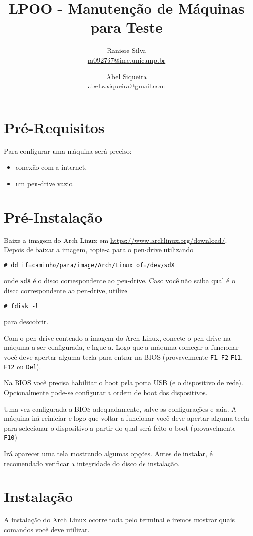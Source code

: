 \documentclass[A4paper]{article}
\title{LPOO - Manutenção de Máquinas para Teste}
\author{Raniere Silva \\ \url{ra092767@ime.unicamp.br} \and
        Abel Siqueira \\ \url{abel.s.siqueira@gmail.com}}
\begin{document}
\maketitle


\section{Pré-Requisitos}
Para configurar uma máquina será preciso:
\begin{itemize}
  \item conexão com a internet,
  \item um pen-drive vazio.
\end{itemize}

\section{Pré-Instalação}
Baixe a imagem do Arch Linux em \url{https://www.archlinux.org/download/}.
Depois de baixar a imagem, copie-a para o pen-drive utilizando
\begin{lstlisting}
# dd if=caminho/para/image/Arch/Linux of=/dev/sdX
\end{lstlisting}
onde \lstinline+sdX+ é o disco correspondente ao pen-drive. Caso você não saiba
qual é o disco correspondente ao pen-drive, utilize
\begin{lstlisting}
# fdisk -l
\end{lstlisting}
para descobrir.

Com o pen-drive contendo a imagem do Arch Linux, conecte o pen-drive na máquina
a ser configurada, e ligue-a. Logo que a máquina começar a funcionar você deve
apertar alguma tecla para entrar na BIOS (provavelmente \lstinline+F1+,
\lstinline+F2+ \lstinline+F11+, \lstinline+F12+ ou \lstinline+Del+).

Na BIOS você precisa habilitar o boot pela porta USB (e o dispositivo de rede).
Opcionalmente pode-se configurar a ordem de boot dos dispositivos.

Uma vez configurada a BIOS adequadamente, salve as configurações e saia. A
máquina irá reiniciar e logo que voltar a funcionar você deve apertar alguma
tecla para selecionar o dispositivo a partir do qual será feito o boot
(provavelmente \lstinline+F10+).

Irá aparecer uma tela mostrando algumas opções. Antes de instalar, é recomendado
verificar a integridade do disco de instalação.

\section{Instalação}
A instalação do Arch Linux ocorre toda pelo terminal e iremos mostrar quais
comandos você deve utilizar.
\end{document}
